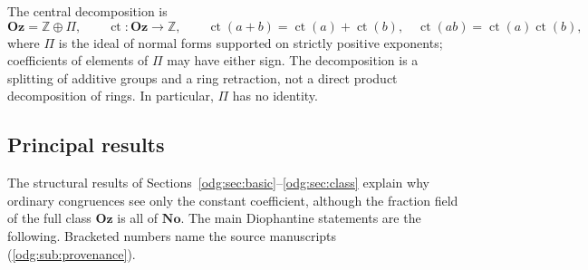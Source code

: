 \documentclass[11pt,oneside]{article}
\numberwithin{equation}{section}
\theoremstyle{definition}
\theoremstyle{remark}
\newcommand{\No}{\mathbf{No}}
\newcommand{\Oz}{\mathbf{Oz}}
\newcommand{\Z}{\mathbb Z}
\newcommand{\ct}{\operatorname{ct}}
\begin{document}
The central decomposition is
\begin{equation}\label{odg:eq:splitintro}
 \Oz=\Z\oplus\Pi,\qquad \ct:\Oz\longrightarrow\Z,
 \qquad \ct(a+b)=\ct(a)+\ct(b),\quad \ct(ab)=\ct(a)\ct(b),
\end{equation}
where $\Pi$ is the ideal of normal forms supported on strictly positive
exponents; coefficients of elements of $\Pi$ may have either sign. The
decomposition is a splitting of additive groups and a ring retraction, not a
direct product decomposition of rings. In particular, $\Pi$ has no identity.

\subsection{Principal results}\label{odg:sub:results}

The structural results of
Sections~\ref{odg:sec:basic}--\ref{odg:sec:class} explain why ordinary
congruences see only the constant coefficient, although the fraction field
of the full class $\Oz$ is all of $\No$. The main Diophantine statements are
the following. Bracketed numbers name the source manuscripts
(\cref{odg:sub:provenance}).
\end{document}
